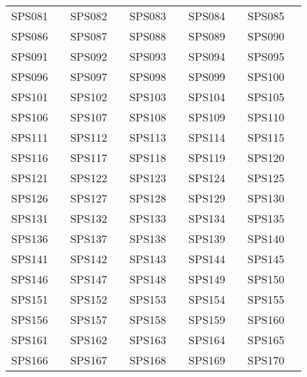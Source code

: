 \begin{table*}[htbp]
\begin{tabularx}{\textwidth}{c>{\centering\arraybackslash}X c>{\centering\arraybackslash}X c>{\centering\arraybackslash}X c>{\centering\arraybackslash}X c>{\centering\arraybackslash}X}
SPS081 & \cite{81} & SPS082 & \cite{82} & SPS083 & \cite{83} & SPS084 & \cite{84} & SPS085 & \cite{85} \\
SPS086 & \cite{86} & SPS087 & \cite{87} & SPS088 & \cite{88} & SPS089 & \cite{89} & SPS090 & \cite{90} \\
SPS091 & \cite{91} & SPS092 & \cite{92} & SPS093 & \cite{93} & SPS094 & \cite{94} & SPS095 & \cite{95} \\
SPS096 & \cite{96} & SPS097 & \cite{97} & SPS098 & \cite{98} & SPS099 & \cite{99} & SPS100 & \cite{100} \\
SPS101 & \cite{101} & SPS102 & \cite{102} & SPS103 & \cite{103} & SPS104 & \cite{104} & SPS105 & \cite{105} \\
SPS106 & \cite{106} & SPS107 & \cite{107} & SPS108 & \cite{108} & SPS109 & \cite{109} & SPS110 & \cite{110} \\
SPS111 & \cite{111} & SPS112 & \cite{112} & SPS113 & \cite{113} & SPS114 & \cite{114} & SPS115 & \cite{115} \\
SPS116 & \cite{116} & SPS117 & \cite{117} & SPS118 & \cite{118} & SPS119 & \cite{119} & SPS120 & \cite{120} \\
SPS121 & \cite{121} & SPS122 & \cite{122} & SPS123 & \cite{123} & SPS124 & \cite{124} & SPS125 & \cite{125} \\
SPS126 & \cite{126} & SPS127 & \cite{127} & SPS128 & \cite{128} & SPS129 & \cite{129} & SPS130 & \cite{130} \\
SPS131 & \cite{131} & SPS132 & \cite{132} & SPS133 & \cite{133} & SPS134 & \cite{134} & SPS135 & \cite{135} \\
SPS136 & \cite{136} & SPS137 & \cite{137} & SPS138 & \cite{138} & SPS139 & \cite{139} & SPS140 & \cite{140} \\
SPS141 & \cite{141} & SPS142 & \cite{142} & SPS143 & \cite{143} & SPS144 & \cite{144} & SPS145 & \cite{145} \\
SPS146 & \cite{146} & SPS147 & \cite{147} & SPS148 & \cite{148} & SPS149 & \cite{149} & SPS150 & \cite{150} \\
SPS151 & \cite{151} & SPS152 & \cite{152} & SPS153 & \cite{153} & SPS154 & \cite{154} & SPS155 & \cite{155} \\
SPS156 & \cite{156} & SPS157 & \cite{157} & SPS158 & \cite{158} & SPS159 & \cite{159} & SPS160 & \cite{160} \\
SPS161 & \cite{161} & SPS162 & \cite{162} & SPS163 & \cite{163} & SPS164 & \cite{164} & SPS165 & \cite{165} \\
SPS166 & \cite{166} & SPS167 & \cite{167} & SPS168 & \cite{168} & SPS169 & \cite{169} & SPS170 & \cite{170} \\

\end{tabularx}
\end{table*}

